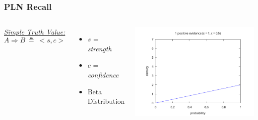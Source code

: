 \documentclass[aspectratio=169]{beamer}
\newcommand{\limp}{\Rightarrow}
\newcommand{\STV}[2]{<\!#1, #2\!>}
\begin{document}
\begin{frame}
  \frametitle{PLN Recall}
  \begin{columns}
    \column{5cm}
    \underline{\emph{Simple Truth Value:}}
    $$A \limp B\ \measeq\ \STV{s}{c}$$
    \begin{itemize}
    \item $s$ = \emph{strength}
    \item $c$ = \emph{confidence}
    \item Beta Distribution
    \end{itemize}
    \column{10cm}
    \includegraphics[scale=0.4]{figs/observations_0_1.png}
  \end{columns}
\end{frame}
\end{document}
